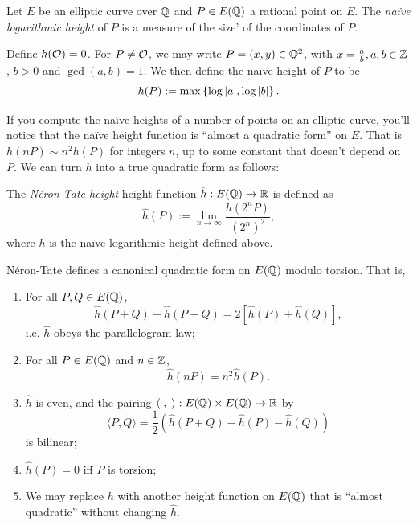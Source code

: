 Let $E$ be an elliptic curve over $\mathbb{Q}$ and $P \in E(\mathbb{Q})$ a rational point on $E$. The {\it na\"ive logarithmic height} of $P$ is a measure of the size' of the coordinates of $P$. 
\begin{definition}
Define $h(\mathcal{O}) = 0$. For $P\ne \mathcal{O}$, we may write $P = (x,y) \in \mathbb{Q}^2$, with $x = \frac{a}{b}, a,b \in \mathbb{Z}$, $b>0$ and $\gcd(a,b) = 1$. We then define the na\"ive height of $P$ to be
\begin{equation}
	h(P) := \max\left\{\log|a|,\log|b|\right\}.
\end{equation}
\end{definition}
If you compute the na\"ive heights of a number of points on an elliptic curve, you'll notice that the na\"ive height function is ``almost a quadratic form'' on $E$. That is $h(nP) \sim n^2 h(P)$ for integers $n$, up to some constant that doesn't depend on $P$. We can turn $h$ into a true quadratic form as follows:

\begin{definition}
The {\it N\'eron-Tate height} height function $\hat{h}: E(\mathbb{Q}) \to \mathbb{R}$ is defined as
\begin{equation}
	\hat{h}(P) := \lim_{n \to \infty} \frac{h(2^n P)}{(2^n)^2},
\end{equation}
where $h$ is the na\"ive logarithmic height defined above.
\end{definition}

\begin{theorem}
N\'eron-Tate defines a canonical quadratic form on $E(\mathbb{Q})$ modulo torsion. That is,
\begin{enumerate}
	\item For all $P,Q \in E(\mathbb{Q})$,
	\begin{equation}
		\hat{h}(P+Q) + \hat{h}(P-Q) = 2\left[ \hat{h}(P) + \hat{h}(Q)\right],
	\end{equation}
	i.e. $\hat{h}$ obeys the parallelogram law;
	\item For all $P \in E(\mathbb{Q})$ and $n \in \mathbb{Z}$,
	\begin{equation}
		\hat{h}(nP) = n^2 \hat{h}(P).
	\end{equation}
	\item $\hat{h}$ is even, and the pairing $\langle\;,\;\rangle: E(\mathbb{Q})\times E(\mathbb{Q}) \to \mathbb{R}$ by
	\begin{equation}
		\langle P,Q \rangle = \frac{1}{2}\left(\hat{h}(P+Q) - \hat{h}(P) - \hat{h}(Q)\right)
	\end{equation}
	is bilinear;
	\item $\hat{h}(P) = 0$ iff $P$ is torsion;
	\item We may replace $h$ with another height function on $E(\mathbb{Q})$ that is ``almost quadratic'' without changing $\hat{h}$.
\end{enumerate}
\end{theorem}

